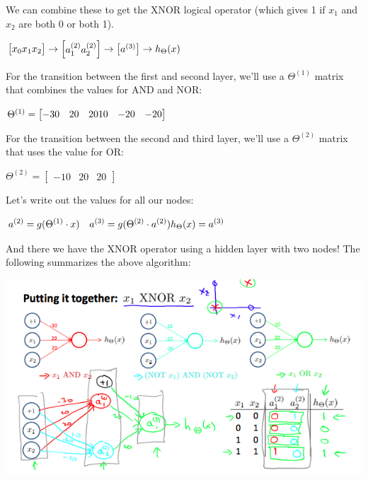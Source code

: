 \documentclass[
]{article}
\begin{document}
We can combine these to get the XNOR logical operator (which gives 1 if
\(x_1\) and \(x_2\) are both 0 or both 1).

\(\begin{align*}\begin{bmatrix}x_0 \newline x_1 \newline x_2\end{bmatrix} \rightarrow\begin{bmatrix}a_1^{(2)} \newline a_2^{(2)} \end{bmatrix} \rightarrow\begin{bmatrix}a^{(3)}\end{bmatrix} \rightarrow h_\Theta(x)\end{align*}\)

For the transition between the first and second layer, we'll use a
\(Θ^{(1)}\) matrix that combines the values for AND and NOR:

\(\Theta^{(1)} =\begin{bmatrix}-30 & 20 & 20 \newline 10 & -20 & -20\end{bmatrix}\)

For the transition between the second and third layer, we'll use a
\(Θ^{(2)}\) matrix that uses the value for OR:

\(\Theta^{(2)} =\begin{bmatrix}-10 & 20 & 20\end{bmatrix}\)

Let's write out the values for all our nodes:

\(\begin{align*}& a^{(2)} = g(\Theta^{(1)} \cdot x) \newline& a^{(3)} = g(\Theta^{(2)} \cdot a^{(2)}) \newline& h_\Theta(x) = a^{(3)}\end{align*}\)

And there we have the XNOR operator using a hidden layer with two nodes!
The following summarizes the above algorithm:

\includegraphics{NN_example_3.png}
\end{document}
